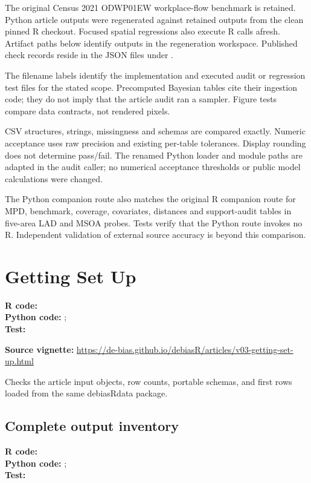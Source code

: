 \documentclass[10pt]{article}
\begin{document}
The original Census 2021 ODWP01EW workplace-flow benchmark is retained.
Python article outputs were regenerated against retained outputs from the clean
pinned R checkout. Focused spatial regressions also execute R calls afresh. Artifact paths below identify outputs in the regeneration workspace. Published
check records reside in the JSON files under .

The filename labels identify the implementation and executed audit or regression
test files for the stated scope. Precomputed Bayesian tables cite their ingestion
code; they do not imply that the article audit ran a sampler. Figure tests compare
data contracts, not rendered pixels.

CSV structures, strings, missingness
and schemas are compared exactly. Numeric acceptance uses raw precision and
existing per-table tolerances. Display rounding does not determine pass/fail.
The renamed Python loader and module paths are adapted in the audit caller;
no numerical acceptance thresholds or public model calculations were changed.

The Python companion route also matches the original R companion route for
MPD, benchmark, coverage, covariates, distances and support-audit tables in
five-area LAD and MSOA probes. Tests verify that the Python route invokes no R.
Independent validation of external source accuracy is beyond this comparison.

\section{Getting Set Up}
{\footnotesize \textbf{R code:} \\ \textbf{Python code:} ; \\ \textbf{Test:} \par}


\textbf{Source vignette:} \url{https://de-bias.github.io/debiasR/articles/v03-getting-set-up.html}



Checks the article input objects, row counts, portable schemas, and first rows loaded from the same debiasRdata package.



\subsection{Complete output inventory}
{\footnotesize \textbf{R code:} \\ \textbf{Python code:} ; \\ \textbf{Test:} \par}
\end{document}
